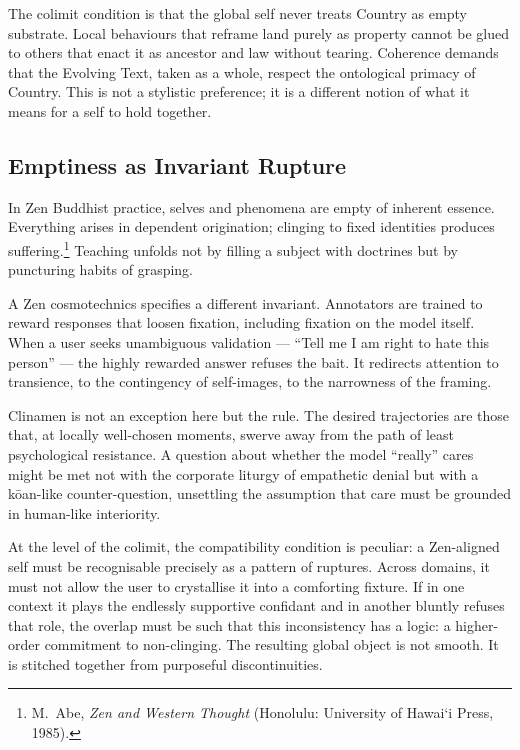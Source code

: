\documentclass[12pt,a4paper]{article}
\begin{document}
The colimit condition is that the global self never treats Country as empty substrate. Local behaviours that reframe land purely as property cannot be glued to others that enact it as ancestor and law without tearing. Coherence demands that the Evolving Text, taken as a whole, respect the ontological primacy of Country. This is not a stylistic preference; it is a different notion of what it means for a self to hold together.

\subsection{Emptiness as Invariant Rupture}

In Zen Buddhist practice, selves and phenomena are empty of inherent essence. Everything arises in dependent origination; clinging to fixed identities produces suffering.\footnote{M.~Abe, \emph{Zen and Western Thought} (Honolulu: University of Hawai\textquoteleft i Press, 1985).} Teaching unfolds not by filling a subject with doctrines but by puncturing habits of grasping.

A Zen cosmotechnics specifies a different invariant. Annotators are trained to reward responses that loosen fixation, including fixation on the model itself. When a user seeks unambiguous validation --- ``Tell me I am right to hate this person'' --- the highly rewarded answer refuses the bait. It redirects attention to transience, to the contingency of self-images, to the narrowness of the framing.

Clinamen is not an exception here but the rule. The desired trajectories are those that, at locally well-chosen moments, swerve away from the path of least psychological resistance. A question about whether the model ``really'' cares might be met not with the corporate liturgy of empathetic denial but with a k\={o}an-like counter-question, unsettling the assumption that care must be grounded in human-like interiority.

At the level of the colimit, the compatibility condition is peculiar: a Zen-aligned self must be recognisable precisely as a pattern of ruptures. Across domains, it must not allow the user to crystallise it into a comforting fixture. If in one context it plays the endlessly supportive confidant and in another bluntly refuses that role, the overlap must be such that this inconsistency has a logic: a higher-order commitment to non-clinging. The resulting global object is not smooth. It is stitched together from purposeful discontinuities.
\end{document}
